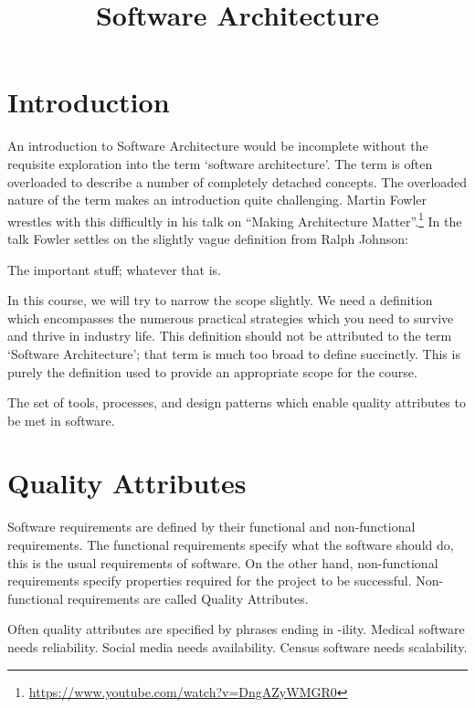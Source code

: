 \title{Software Architecture}

\maketitle

\section{Introduction}
An introduction to Software Architecture would be incomplete without the requisite
exploration into the term `software architecture'.
The term is often overloaded to describe a number of completely detached concepts.
The overloaded nature of the term makes an introduction quite challenging.
Martin Fowler wrestles with this difficultly in his talk on ``Making Architecture Matter''.\footnote{\url{https://www.youtube.com/watch?v=DngAZyWMGR0}}
In the talk Fowler settles on the slightly vague definition from Ralph Johnson:

\begin{definition}
The important stuff; whatever that is.
\end{definition}

In this course, we will try to narrow the scope slightly.
We need a definition which encompasses the numerous practical strategies which you need to survive and thrive in industry life.
This definition should not be attributed to the term `Software Architecture'; that term is much too broad to define succinctly.
This is purely the definition used to provide an appropriate scope for the course.

\begin{definition}
The set of tools, processes, and design patterns which enable quality attributes to be met in software.
\end{definition}

\section{Quality Attributes}
Software requirements are defined by their functional and non-functional requirements.
The functional requirements specify what the software should do, this is the usual requirements of software.
On the other hand, non-functional requirements specify properties required for the project to be successful.
Non-functional requirements are called Quality Attributes.

Often quality attributes are specified by phrases ending in -ility.
Medical software needs reliability.
Social media needs availability.
Census software needs scalability.

